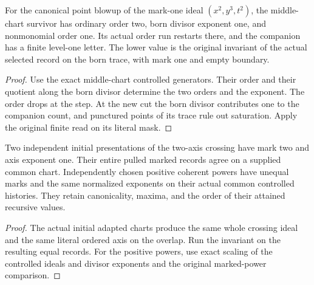 \begin{theorem}
\label{hir:g1-recursive-born-order-example}
\leanok
For the canonical point blowup of the mark-one ideal
$(x^2,y^3,t^2)$, the middle-chart survivor has ordinary order two,
born divisor exponent one, and nonmonomial order one. Its actual
order run restarts there, and the companion has a finite level-one
letter. The lower value is the original invariant of the actual
selected record on the born trace, with mark one and empty boundary.
\end{theorem}
\begin{proof}
Use the exact middle-chart controlled generators. Their order
and their quotient along the born divisor determine the two orders
and the exponent. The order drops at the step. At the new cut the
born divisor contributes one to the companion count, and punctured
points of its trace rule out saturation. Apply the original finite
read on its literal mask.
\end{proof}

\begin{theorem}
\label{hir:g1-native-crossing-independent-histories}
\leanok
Two independent initial presentations of the two-axis crossing
have mark two and axis exponent one. Their entire pulled marked
records agree on a supplied common chart. Independently chosen
positive coherent powers have unequal marks and the same normalized
exponents on their actual common controlled histories. They retain
canonicality, maxima, and the order of their attained recursive values.
\end{theorem}
\begin{proof}
The actual initial adapted charts produce the same whole
crossing ideal and the same literal ordered axis on the overlap.
Run the invariant on the resulting equal records. For the
positive powers, use exact scaling of the controlled ideals
and divisor exponents and the original marked-power comparison.
\end{proof}

